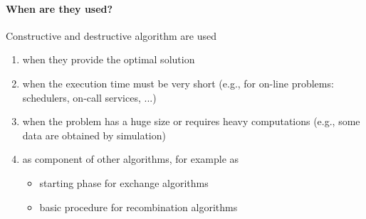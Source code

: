 \paragraph{When are they used?} Constructive and destructive algorithm are used
\begin{enumerate}
	\item when they provide the optimal solution
	
	\item when the execution time must be very short (e.g., for on-line problems: schedulers, on-call services, ...)
	
	\item when the problem has a huge size or requires heavy computations (e.g., some data are obtained by simulation)
	
	\item as component of other algorithms, for example as
	\begin{itemize}
		\item starting phase for exchange algorithms
		\item basic procedure for recombination algorithms
	\end{itemize}
\end{enumerate}


\newpage